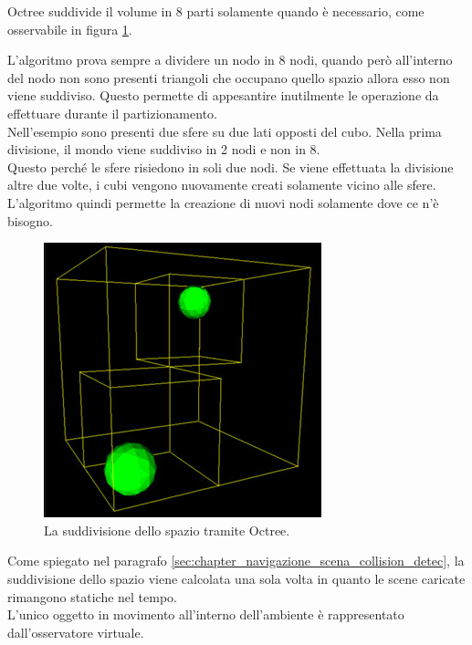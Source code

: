 Octree suddivide il volume in 8 parti solamente quando è necessario, come osservabile in figura \ref{fig:navigazione_scena_collision_full_octree}.

L’algoritmo prova sempre a dividere un nodo in 8 nodi, quando però all’interno del nodo non sono presenti triangoli che occupano quello spazio allora esso non viene suddiviso. 
Questo permette di appesantire inutilmente le operazione da effettuare durante il partizionamento.
\\
Nell’esempio sono presenti due sfere su due lati opposti del cubo.  Nella prima divisione, il mondo viene suddiviso in 2 nodi e non in 8. 
\\
Questo perché le sfere risiedono in soli due nodi.
Se viene effettuata la divisione altre due volte, i cubi vengono nuovamente creati solamente vicino alle sfere. L’algoritmo quindi permette la creazione di nuovi nodi solamente dove ce n’è bisogno.

\begin{figure}[htb]
 \centering
 \includegraphics[width=0.6\linewidth]{images/chapter_navigazione_scena/div_2sfere.png}\hfill
 \caption[Octree e la suddivisione dello spazio.]{La suddivisione dello spazio tramite Octree.}
 \label{fig:navigazione_scena_collision_full_octree}
\end{figure}

Come spiegato nel paragrafo \ref{sec:chapter_navigazione_scena_collision_detec}, la suddivisione dello spazio viene calcolata una sola volta in quanto le scene caricate rimangono statiche nel tempo. 
\\
L’unico oggetto in movimento all’interno dell’ambiente è rappresentato dall’osservatore virtuale.

